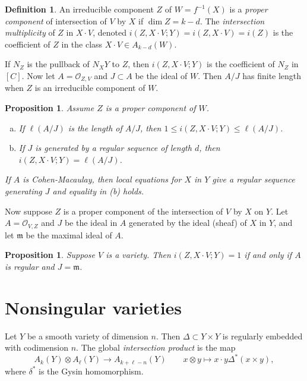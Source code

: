 \documentclass[leqno, openany]{memoir}
\newtheorem{prop}[thm]{Proposition}
\theoremstyle{definition}
\newtheorem{defn}[thm]{Definition}
\theoremstyle{remark}
\theoremstyle{plain}
\theoremstyle{definition}
\theoremstyle{remark}
\newcommand{\mc}[1]{\mathcal{#1}}
\newcommand{\mf}[1]{\mathfrak{#1}}
\begin{document}
\begin{defn}
    An irreducible component $Z$ of $W = f^{-1}(X)$ is a \textit{proper component} of intersection of $V$ by $X$ if $\dim Z = k-d$. The \textit{intersection multiplicity} of $Z$ in $X \cdot V$, denoted $i(Z, X \cdot V; Y) = i(Z, X \cdot V) = i(Z)$ is the coefficient of $Z$ in the class $X \cdot V \in A_{k-d}(W)$. 
\end{defn}

If $N_Z$ is the pullback of $N_X Y$ to $Z$, then $i(Z,X\cdot V; Y)$ is the coefficient of $N_Z$ in $[C]$. Now let $A = \mc{O}_{Z,V}$ and $J \subset A$ be the ideal of $W$. Then $A/J$ has finite length when $Z$ is an irreducible component of $W$.

\begin{prop}
    Assume $Z$ is a proper component of $W$.
    \begin{enumerate}[(a)]
        \item If $\ell(A/J)$ is the length of $A/J$, then $1 \leq i(Z, X \cdot V; Y) \leq \ell(A/J)$.
        \item If $J$ is generated by a regular sequence of length $d$, then $i(Z, X \cdot V; Y) = \ell(A/J)$.
    \end{enumerate}
    If $A$ is Cohen-Macaulay, then local equations for $X$ in $Y$ give a regular sequence generating $J$ and equality in (b) holds.
\end{prop}

Now suppose $Z$ is a proper component of the intersection of $V$ by $X$ on $Y$. Let $A = \mc{O}_{V,Z}$ and $J$ be the ideal in $A$ generated by the ideal (sheaf) of $X$ in $Y$, and let $\mf{m}$ be the maximal ideal of $A$.

\begin{prop}
    Suppose $V$ is a variety. Then $i(Z, X \cdot V; Y) = 1$ if and only if $A$ is regular and $J = \mf{m}$.
\end{prop}

\section{Nonsingular varieties}%
\label{sec:nonsingular_varieties}

Let $Y$ be a smooth variety of dimension $n$. Then $\Delta \subset Y \times Y$ is regularly embedded with codimension $n$. The global \textit{intersection product} is the map 
\[ A_k(Y) \otimes A_{\ell}(Y) \to A_{k+\ell-n}(Y) \qquad x \otimes y \mapsto x \cdot y \Delta^*(x \times y), \] 
where $\delta^*$ is the Gysin homomorphism.
\end{document}
